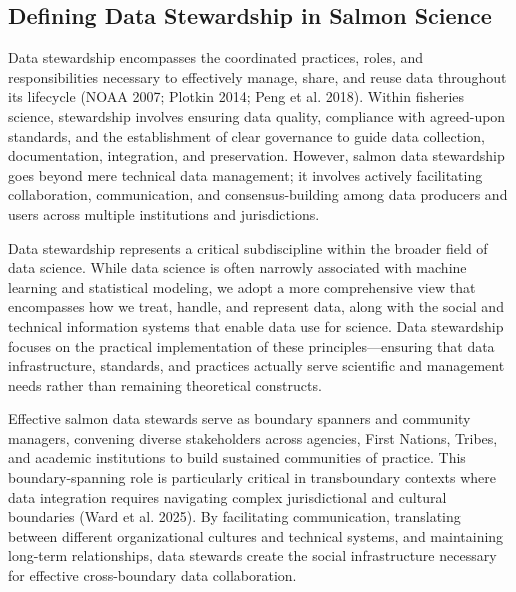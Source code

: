 \documentclass[
  letterpaper,
  DIV=11,
  numbers=noendperiod]{scrartcl}
\begin{document}
\subsection{Defining Data Stewardship in Salmon
Science}\label{defining-data-stewardship-in-salmon-science}

Data stewardship encompasses the coordinated practices, roles, and
responsibilities necessary to effectively manage, share, and reuse data
throughout its lifecycle (NOAA 2007; Plotkin 2014; Peng et al. 2018).
Within fisheries science, stewardship involves ensuring data quality,
compliance with agreed-upon standards, and the establishment of clear
governance to guide data collection, documentation, integration, and
preservation. However, salmon data stewardship goes beyond mere
technical data management; it involves actively facilitating
collaboration, communication, and consensus-building among data
producers and users across multiple institutions and jurisdictions.

Data stewardship represents a critical subdiscipline within the broader
field of data science. While data science is often narrowly associated
with machine learning and statistical modeling, we adopt a more
comprehensive view that encompasses how we treat, handle, and represent
data, along with the social and technical information systems that
enable data use for science. Data stewardship focuses on the practical
implementation of these principles---ensuring that data infrastructure,
standards, and practices actually serve scientific and management needs
rather than remaining theoretical constructs.

Effective salmon data stewards serve as boundary spanners and community
managers, convening diverse stakeholders across agencies, First Nations,
Tribes, and academic institutions to build sustained communities of
practice. This boundary-spanning role is particularly critical in
transboundary contexts where data integration requires navigating
complex jurisdictional and cultural boundaries (Ward et al. 2025). By
facilitating communication, translating between different organizational
cultures and technical systems, and maintaining long-term relationships,
data stewards create the social infrastructure necessary for effective
cross-boundary data collaboration.
\end{document}
